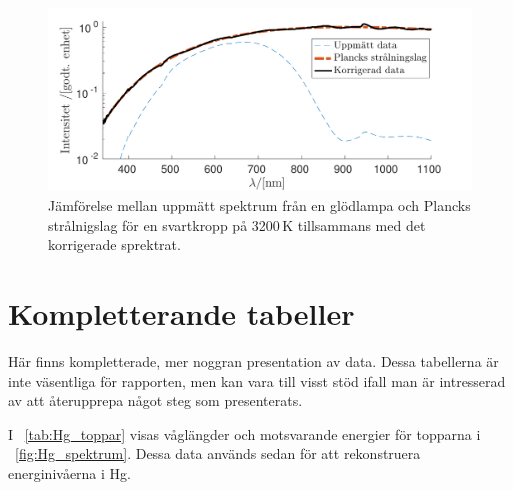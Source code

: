 \documentclass[11pt,a4paper]{article}
\newcommand{\figref}{\figurename~\ref}
\newcommand{\tabref}{\tablename~\ref} %
\begin{document}
\begin{figure}\centering
\centerline{ %
\includegraphics[width=.8\textwidth]{anpassad_svartkropp.pdf}
}
\caption{Jämförelse mellan uppmätt spektrum från en glödlampa och
  Plancks strålnigslag för en svartkropp på 3200\,K tillsammans med
  det korrigerade sprektrat. }
\label{fig:anpassad_svartkropp}
\end{figure}


\section{Kompletterande tabeller}\label{sec:kompl}
Här finns kompletterade, mer noggran presentation av data. Dessa tabellerna är inte väsentliga för rapporten, men kan vara till visst stöd ifall man är intresserad av att återupprepa något steg som presenterats.

I \tabref{tab:Hg_toppar} visas våglängder och motsvarande energier för topparna i \figref{fig:Hg_spektrum}. Dessa data används sedan för att rekonstruera energinivåerna i Hg.
\end{document}
